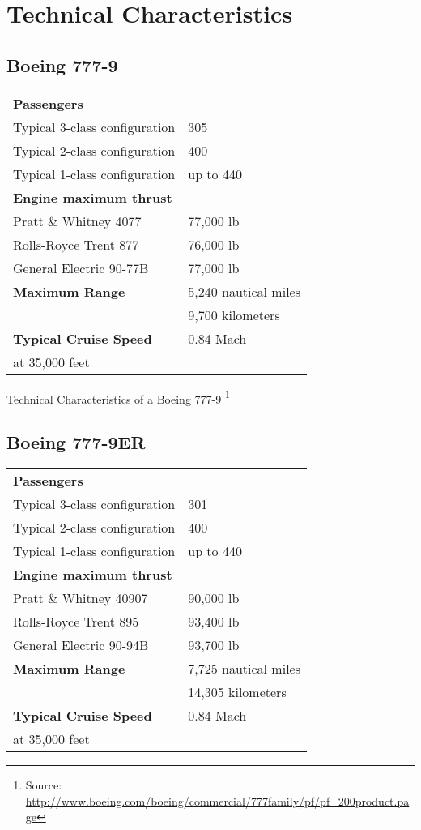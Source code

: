 \section{Technical Characteristics}

\subsection{Boeing 777-9}
\begin{tabular}{l l}
\textbf{Passengers} & \\
Typical 3-class configuration & 305 \\
Typical 2-class configuration & 400 \\
Typical 1-class configuration & up to 440 \\
\hline
\textbf{Engine maximum thrust} & \\
Pratt \& Whitney 4077 & 77,000 lb \\
Rolls-Royce Trent 877 & 76,000 lb \\
General Electric 90-77B & 77,000 lb \\
\hline
\textbf{Maximum Range} & 5,240 nautical miles \\
& 9,700 kilometers\\
\hline
\textbf {Typical Cruise Speed} & 0.84 Mach \\
at 35,000 feet & \\
\end{tabular}

Technical Characteristics of a Boeing 777-9 \footnote{Source: \url{http://www.boeing.com/boeing/commercial/777family/pf/pf_200product.page}}

\subsection{Boeing 777-9ER}
\begin{tabular}{l l}
\textbf{Passengers} & \\
Typical 3-class configuration & 301 \\
Typical 2-class configuration & 400 \\
Typical 1-class configuration & up to 440 \\
\hline
\textbf{Engine maximum thrust} & \\
Pratt \& Whitney 40907 & 90,000 lb \\
Rolls-Royce Trent 895 & 93,400 lb \\
General Electric 90-94B & 93,700 lb \\
\hline
\textbf{Maximum Range} & 7,725 nautical miles \\
& 14,305 kilometers\\
\hline
\textbf {Typical Cruise Speed} & 0.84 Mach \\
at 35,000 feet & \\
\end{tabular}

